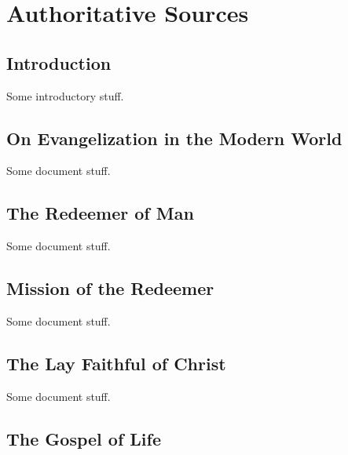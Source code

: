 \documentclass[oneside]{book}
\begin{document}
\part{Authoritative Sources}


\chapter{Introduction}

Some introductory stuff.


\chapter{On Evangelization in the Modern World}

Some document stuff.


\chapter{The Redeemer of Man}

Some document stuff.


\chapter{Mission of the Redeemer}

Some document stuff.


\chapter{The Lay Faithful of Christ}

Some document stuff.


\chapter{The Gospel of Life}
\end{document}
